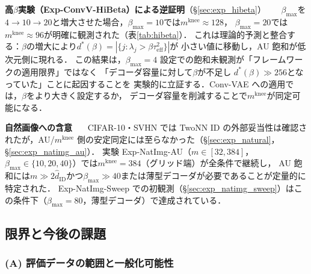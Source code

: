\documentclass[11pt,a4paper]{jsarticle}
\newcommand{\mknee}{m^{\mathrm{knee}}}
\begin{document}
\textbf{高$\beta$実験（Exp-ConvV-HiBeta）による逆証明}（§\ref{sec:exp_hibeta}）~~~
$\beta_{\max}$を$4\to10\to20$と増大させた場合，$\beta_{\max}=10$では$\mknee \approx 128$，
$\beta_{\max}=20$では$\mknee \approx 96$が明確に観測された（表\ref{tab:hibeta}）．
これは理論的予測と整合する：$\beta$の増大により$d^*(\beta) = |\{j: \lambda_j > \beta\tau^2_\mathrm{eff}\}|$が
小さい値に移動し，AU 飽和が低次元側に現れる．
この結果は，$\beta_{\max}=4$ 設定での飽和未観測が「フレームワークの適用限界」ではなく
「デコーダ容量に対して$\beta$が不足し $d^*(\beta) \gg 256$となっていた」ことに起因することを
実験的に立証する．Conv-VAE への適用では，$\beta$をより大きく設定するか，
デコーダ容量を削減することで$\mknee$が同定可能になる．


\textbf{自然画像への含意}~~~
CIFAR-10・SVHN では TwoNN ID の外部妥当性は確認されたが，AU/$\mknee$ 側の安定同定には至らなかった（§\ref{sec:exp_natural}，§\ref{sec:exp_natimg_au}）．
実験 Exp-NatImg-AU（$m \in [32, 384]$，$\beta_{\max} \in \{10,20,40\}$）では$\mknee = 384$（グリッド端）が全条件で継続し，
AU 飽和には$m \gg 2\hat{d}_\mathrm{ID}$かつ$\beta_{\max} \gg 40$または薄型デコーダが必要であることが定量的に特定された．
Exp-NatImg-Sweep での初観測（§\ref{sec:exp_natimg_sweep}）はこの条件下（$\beta_{\max}=80$，薄型デコーダ）で達成されている．

\subsection{限界と今後の課題}\label{sec:disc_limitation}

\subsubsection*{(A) 評価データの範囲と一般化可能性}
\end{document}
